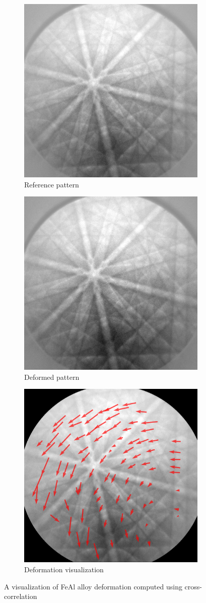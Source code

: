 \begin{figure}[h]
	\centering
	\begin{subfigure}{.33\textwidth}
		\centering
		\includegraphics[width=.6\linewidth]{img/roi_shifts_initial}
		\caption{Reference pattern}
		\label{roi-shifts:initial}
	\end{subfigure}%
	\begin{subfigure}{.33\textwidth}
		\centering
		\includegraphics[width=.6\linewidth]{img/DEFORMED_x3600y6235}
		\caption{Deformed pattern}
		\label{roi-shifts:deformed}
	\end{subfigure}
	\begin{subfigure}{.33\textwidth}
		\centering
		\includegraphics[width=.6\linewidth]{img/roi_shifts}
		\caption{Deformation visualization}
		\label{roi-shifts:result}
	\end{subfigure}
	
	\caption{A visualization of FeAl alloy deformation computed using cross-correlation}
	\label{roi-shifts}
\end{figure}

